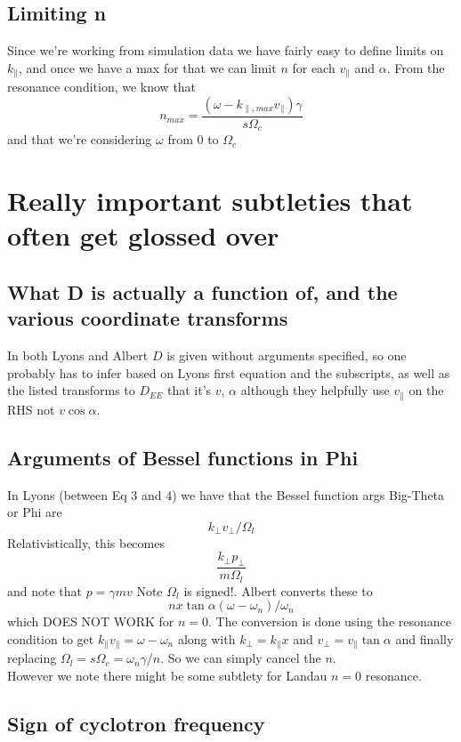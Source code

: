 \documentclass[]{article}
\begin{document}
\subsection{Limiting n}
Since we're working from simulation data we have fairly easy to define limits on $k_\parallel$, and once we have a max for that we can limit $n$ for each $v_\parallel$ and $\alpha$. From the resonance condition, we know that 
\[ n_{max} = \frac{(\omega - k_{\parallel, max} v_\parallel)\gamma}{s \Omega_c} \] and that we're considering $\omega$ from 0 to $\Omega_c$



\section{Really important subtleties that often get glossed over}

\subsection{What D is actually a function of, and the various coordinate transforms}

In both Lyons and Albert $D$ is given without arguments specified, so one probably has to infer based on Lyons  first equation and the subscripts, as well as the listed transforms to $D_{EE}$ that it's $ v$, $\alpha$ although they helpfully use $v_\parallel$ on the RHS not $v \cos\alpha$. 


\subsection{Arguments of Bessel functions in Phi}
In Lyons (between Eq 3 and 4) we have that the Bessel function args Big-Theta or Phi are
\[ k_\perp v_\perp / \Omega_l\]
Relativistically, this becomes
\[ \frac{k_\perp p_\perp}{m \Omega_l}\] and note that $p= \gamma m v$
Note $\Omega_l$ is signed!. Albert converts these to 
\[ n x \tan \alpha (\omega -\omega_n)/\omega_n\] which DOES NOT WORK for $n = 0$. The conversion is done using the resonance condition to get $k_\parallel v_\parallel = \omega -\omega_n$ along with $k_\perp = k_\parallel x$ and $v_\perp = v_\parallel \tan\alpha$ and finally replacing $\Omega_l = s \Omega_c = \omega_n \gamma / n$. So we can simply cancel the $n$. 
\\However we note there might be some subtlety for Landau $n=0$ resonance. 

\subsection{Sign of cyclotron frequency}
\end{document}
